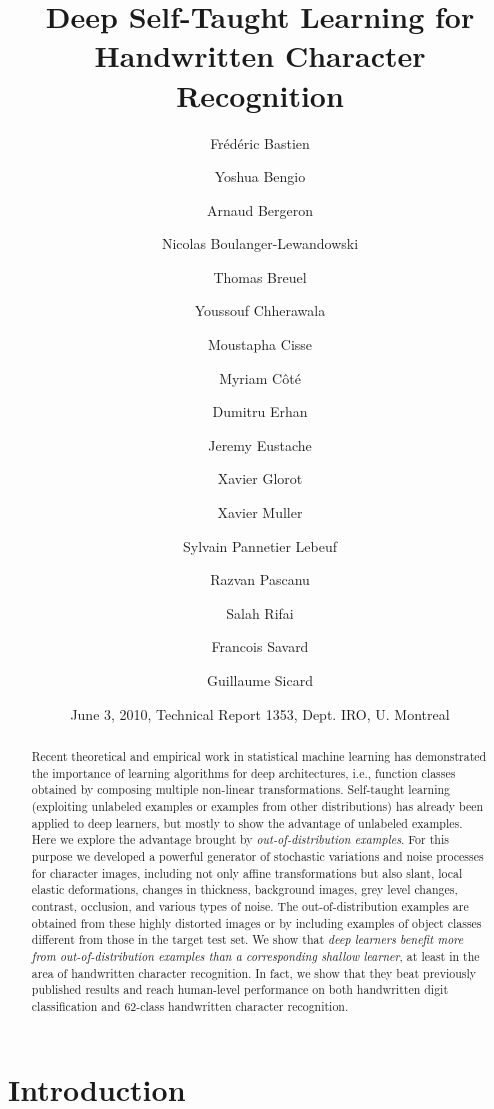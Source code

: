 \documentclass{article} %
\title{Deep Self-Taught Learning for Handwritten Character Recognition}
\author{
Frédéric  Bastien \and
Yoshua  Bengio \and
Arnaud  Bergeron \and
Nicolas  Boulanger-Lewandowski \and
Thomas  Breuel \and
Youssouf  Chherawala \and
Moustapha  Cisse \and 
Myriam  Côté \and 
Dumitru  Erhan \and
Jeremy  Eustache \and
Xavier  Glorot \and 
Xavier  Muller \and
Sylvain  Pannetier Lebeuf \and
Razvan  Pascanu \and 
Salah  Rifai \and 
Francois  Savard \and 
Guillaume  Sicard 
}
\date{June 3, 2010, Technical Report 1353, Dept. IRO, U. Montreal}
\begin{document}
\maketitle

\begin{abstract}
  Recent theoretical and empirical work in statistical machine learning has demonstrated the importance of learning algorithms for deep architectures, i.e., function classes obtained by composing multiple non-linear transformations. Self-taught learning (exploiting unlabeled examples or examples from other distributions) has already been applied to deep learners, but mostly to show the advantage of unlabeled examples. Here we explore the advantage brought by {\em out-of-distribution examples}.  For this purpose we developed a powerful generator of stochastic variations and noise processes for character images, including not only affine transformations but also slant, local elastic deformations, changes in thickness, background images, grey level changes, contrast, occlusion, and various types of noise. The out-of-distribution examples are obtained from these highly distorted images or by including examples of object classes different from those in the target test set.  We show that {\em deep learners benefit more from out-of-distribution examples than a corresponding shallow learner}, at least in the area of handwritten character recognition. In fact, we show that they beat previously published results and reach human-level performance on both handwritten digit classification and 62-class handwritten character recognition.
\end{abstract}

\section{Introduction}
\end{document}
